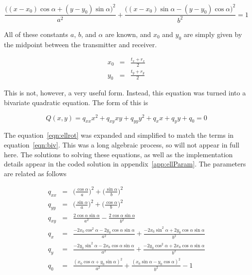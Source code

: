 \documentclass[12pt,openany,a4paper]{book}
\begin{document}
\begin{equation}
\label{eqn:ellrot}
\frac{\bigg((x-x_0)\cos\alpha + (y-y_0)\sin\alpha\bigg)^2}{a^2} + \frac{\bigg((x-x_0)\sin\alpha - (y-y_0)\cos\alpha\bigg)^2}{b^2} = 1
\end{equation}

\bigskip

All of these constants $a$, $b$, and $\alpha$ are known, and $x_0$ and $y_0$ are simply given by the midpoint between the transmitter and receiver.

\begin{eqnarray}
x_0 &=& \frac{t_x + r_x}{2} \\
y_0 &=& \frac{t_y + r_y}{2} 
\end{eqnarray}

\bigskip

This is not, however, a very useful form. Instead, this equation was turned into a bivariate quadratic equation. The form of this is

\begin{equation}
\label{eqn:biv}
Q(x,y) = q_{xx}x^2 + q_{xy}xy + q_{yy}y^2 + q_x x + q_y y + q_0 = 0
\end{equation}

The equation~\ref{eqn:ellrot} was expanded and simplified to match the terms in equation~\ref{eqn:biv}. This was a long algebraic process, so will not appear in full here. The solutions to solving these equations, as well as the implementation details appear in the coded solution in appendix~\ref{app:ellParam}. The parameters are related as follows

\begin{eqnarray}
q_{xx} &=& \Bigg(\frac{\cos\alpha}{a} \Bigg)^2 + \Bigg(\frac{\sin\alpha}{b} \Bigg)^2 \\
q_{yy} &=& \Bigg(\frac{\sin\alpha}{a} \Bigg)^2 + \Bigg(\frac{\cos\alpha}{b} \Bigg)^2 \\
q_{xy} &=& \frac{2\cos\alpha\sin\alpha}{a^2} - \frac{2\cos\alpha\sin\alpha}{b^2} \\
q_x &=& \frac{-2x_0\cos^2\alpha-2y_0\cos\alpha\sin\alpha}{a^2} + \frac{-2x_0\sin^2\alpha+2y_0\cos\alpha\sin\alpha}{b^2} \\
q_y &=& \frac{-2y_0\sin^2\alpha-2x_0\cos\alpha\sin\alpha}{a^2} + \frac{-2y_0\cos^2\alpha+2x_0\cos\alpha\sin\alpha}{b^2} \\
q_0 &=& \frac{(x_0\cos\alpha + y_0\sin\alpha)^2}{a^2} + \frac{(x_0\sin\alpha - y_0\cos\alpha)^2}{b^2} - 1
\end{eqnarray}
\end{document}

